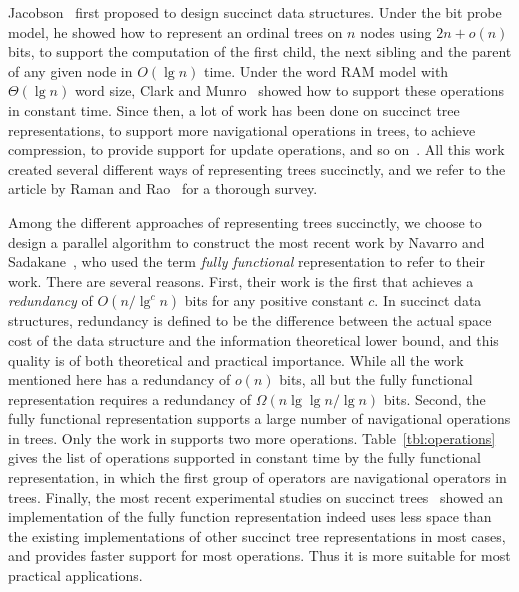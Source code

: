 Jacobson~\cite{j1989} first proposed to design succinct data structures. Under the bit probe model, he showed how to represent an ordinal trees on $n$ nodes using $2n+o(n)$ bits, to support the computation of the first child, the next sibling and the parent of any given node in $O(\lg n)$ time. 
Under the word RAM model with $\Theta(\lg n)$ word size, Clark and Munro~\cite{cm1996} showed how to support these operations in constant time. 
Since then, a lot of work has been done on succinct tree representations, to support more navigational operations in trees, to achieve compression, to provide support for update operations, and so on~\cite{mr1997,bdmr1999,grr2004,jss2007,ly2008,hms2012,fm2014,Navarro:2014:FFS:2620785.2601073}. 
All this work created several different ways of representing trees succinctly, and we refer to the article by Raman and Rao~\cite{rr2013} for a thorough survey.



Among the different approaches of representing trees succinctly, we choose to design a parallel algorithm to construct the most recent work by Navarro and Sadakane~\cite{Navarro:2014:FFS:2620785.2601073}, who used the term {\em fully functional} representation to refer to their work. There are several reasons. 
First, their work is the first that achieves a {\em redundancy} of $O(n/\lg^c n)$ bits for any positive constant $c$. 
In succinct data structures, redundancy is defined to be the difference between the actual space cost of the data structure and the information theoretical lower bound, and this quality is of both theoretical and practical importance. 
While all the work mentioned here has a redundancy of $o(n)$ bits, all but the fully functional representation requires a redundancy of $\Omega(n \lg\lg n / \lg n)$ bits. 
Second, the fully functional representation supports a large number of navigational operations in trees. Only the work in \cite{hms2012,fm2014} supports two more operations. 
Table~\ref{tbl:operations} gives the list of operations supported in constant time by the fully functional representation, in which the first group of operators are navigational operators in trees. 
Finally, the most recent experimental studies on succinct trees~\cite{ACNSalenex10} showed an implementation of the fully function representation indeed uses less space than the existing implementations of other succinct tree representations in most cases, and provides faster support for most operations. Thus it is more suitable for most practical applications. 


